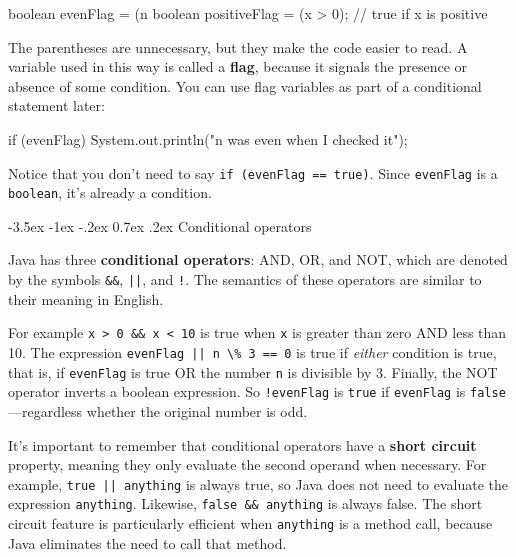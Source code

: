 \documentclass[12pt]{book}
\makeatletter
\renewcommand{\section}{\@startsection {section}{1}{\z@}%
    {-3.5ex \@plus -1ex \@minus -.2ex}%
    {0.7ex \@plus.2ex}%
    {\normalfont\Large\bfseries}}
\theoremstyle{exercise}
\newcommand{\java}[1]{\lstinline{#1}} %
\makeatother
\begin{document}
\begin{code}
    boolean evenFlag = (n %
    boolean positiveFlag = (x > 0);     // true if x is positive
\end{code}

The parentheses are unnecessary, but they make the code easier to read.
A variable used in this way is called a {\bf flag}, because it signals the presence or absence of some condition.
You can use flag variables as part of a conditional statement later:

\begin{code}
    if (evenFlag) {
        System.out.println("n was even when I checked it");
    }
\end{code}

Notice that you don't need to say \java{if (evenFlag == true)}.
Since \java{evenFlag} is a \java{boolean}, it's already a condition.

\section{Conditional operators}


Java has three {\bf conditional operators}: AND, OR, and NOT, which are denoted by the symbols \java{&&}, \java{||}, and \java{!}.
The semantics of these operators are similar to their meaning in English.

For example \java{x > 0 && x < 10} is true when \java{x} is greater than zero AND less than 10.
The expression \java{evenFlag || n \% 3 == 0} is true if {\it either} condition is true, that is, if \java{evenFlag} is true OR the number \java{n} is divisible by 3.
Finally, the NOT operator inverts a boolean expression.
So \java{!evenFlag} is \java{true} if \java{evenFlag} is \java{false}---regardless whether the original number is odd.


It's important to remember that conditional operators have a {\bf short circuit} property, meaning they only evaluate the second operand when necessary.
For example, \java{true || anything} is always true, so Java does not need to evaluate the expression \java{anything}.
Likewise, \java{false && anything} is always false.
The short circuit feature is particularly efficient when \java{anything} is a method call, because Java eliminates the need to call that method.
\end{document}
